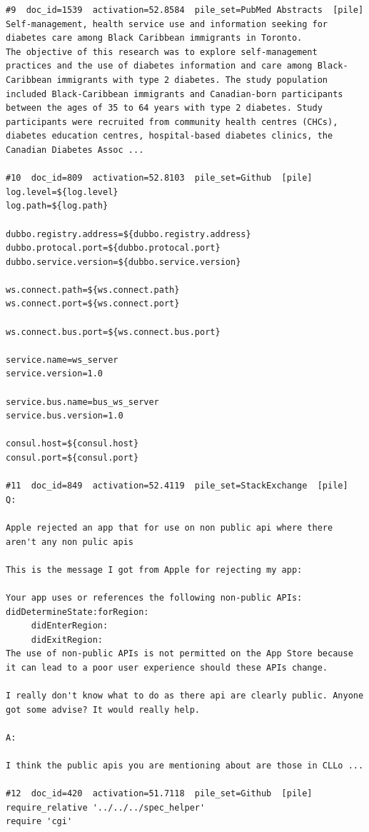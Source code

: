 \begin{verbatim}
#9  doc_id=1539  activation=52.8584  pile_set=PubMed Abstracts  [pile]
Self-management, health service use and information seeking for diabetes care among Black Caribbean immigrants in Toronto.
The objective of this research was to explore self-management practices and the use of diabetes information and care among Black-Caribbean immigrants with type 2 diabetes. The study population included Black-Caribbean immigrants and Canadian-born participants between the ages of 35 to 64 years with type 2 diabetes. Study participants were recruited from community health centres (CHCs), diabetes education centres, hospital-based diabetes clinics, the Canadian Diabetes Assoc ...

#10  doc_id=809  activation=52.8103  pile_set=Github  [pile]
log.level=${log.level}
log.path=${log.path}

dubbo.registry.address=${dubbo.registry.address}
dubbo.protocal.port=${dubbo.protocal.port}
dubbo.service.version=${dubbo.service.version}

ws.connect.path=${ws.connect.path}
ws.connect.port=${ws.connect.port}

ws.connect.bus.port=${ws.connect.bus.port}

service.name=ws_server
service.version=1.0

service.bus.name=bus_ws_server
service.bus.version=1.0

consul.host=${consul.host}
consul.port=${consul.port}

#11  doc_id=849  activation=52.4119  pile_set=StackExchange  [pile]
Q:

Apple rejected an app that for use on non public api where there aren't any non pulic apis

This is the message I got from Apple for rejecting my app:

Your app uses or references the following non-public APIs:
didDetermineState:forRegion:
     didEnterRegion:
     didExitRegion:
The use of non-public APIs is not permitted on the App Store because it can lead to a poor user experience should these APIs change.

I really don't know what to do as there api are clearly public. Anyone got some advise? It would really help.

A:

I think the public apis you are mentioning about are those in CLLo ...

#12  doc_id=420  activation=51.7118  pile_set=Github  [pile]
require_relative '../../../spec_helper'
require 'cgi'


\end{verbatim}
